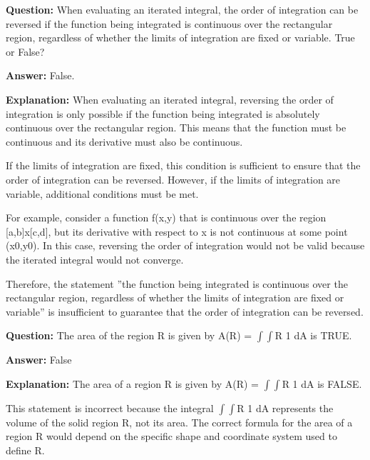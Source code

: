 \documentclass{article}
\begin{document}
                \vspace{0.5cm} 
        
            
                \textbf {Question:} When evaluating an iterated integral, the order of integration can be reversed if the function being integrated is continuous over the rectangular region, regardless of whether the limits of integration are fixed or variable. True or False?
                
                \textbf{Answer:} False.

                \textbf{Explanation:} When evaluating an iterated integral, reversing the order of integration is only possible if the function being integrated is absolutely continuous over the rectangular region. This means that the function must be continuous and its derivative must also be continuous.

If the limits of integration are fixed, this condition is sufficient to ensure that the order of integration can be reversed. However, if the limits of integration are variable, additional conditions must be met.

For example, consider a function f(x,y) that is continuous over the region [a,b]x[c,d], but its derivative with respect to x is not continuous at some point (x0,y0). In this case, reversing the order of integration would not be valid because the iterated integral would not converge.

Therefore, the statement ''the function being integrated is continuous over the rectangular region, regardless of whether the limits of integration are fixed or variable'' is insufficient to guarantee that the order of integration can be reversed.
                
                \vspace{0.5cm} 
        
            
                \textbf {Question:} The area of the region R is given by A(R) = \ensuremath{\int}\ensuremath{\int}R 1 dA is TRUE.
                
                \textbf{Answer:} False

                \textbf{Explanation:} The area of a region R is given by A(R) = \ensuremath{\int}\ensuremath{\int}R 1 dA is FALSE.

This statement is incorrect because the integral \ensuremath{\int}\ensuremath{\int}R 1 dA represents the volume of the solid region R, not its area. The correct formula for the area of a region R would depend on the specific shape and coordinate system used to define R.
                
\end{document}
